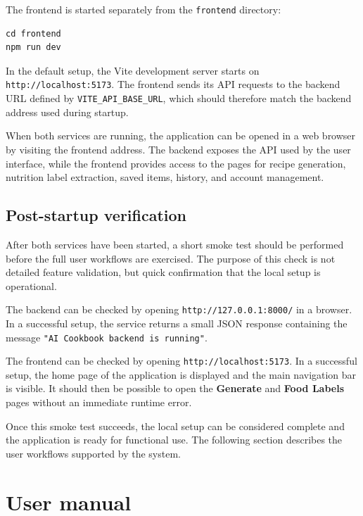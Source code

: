 The frontend is started separately from the \texttt{frontend}
directory:

\begin{lstlisting}
cd frontend
npm run dev
\end{lstlisting}

In the default setup, the Vite development server starts on
\texttt{http://localhost:5173}. The frontend sends its API requests to
the backend URL defined by \texttt{VITE\_API\_BASE\_URL}, which should
therefore match the backend address used during startup.

When both services are running, the application can be opened in a web
browser by visiting the frontend address. The backend exposes the API
used by the user interface, while the frontend provides access to the
pages for recipe generation, nutrition label extraction, saved items,
history, and account management.

\subsection{Post-startup verification}

After both services have been started, a short smoke test should be
performed before the full user workflows are exercised. The purpose of
this check is not detailed feature validation, but quick confirmation
that the local setup is operational.

The backend can be checked by opening
\texttt{http://127.0.0.1:8000/} in a browser. In a successful setup,
the service returns a small JSON response containing the message
\texttt{"AI Cookbook backend is running"}.

The frontend can be checked by opening
\texttt{http://localhost:5173}. In a successful setup, the home page
of the application is displayed and the main navigation bar is visible.
It should then be possible to open the \textbf{Generate} and
\textbf{Food Labels} pages without an immediate runtime error.

Once this smoke test succeeds, the local setup can be considered
complete and the application is ready for functional use. The
following section describes the user workflows supported by the
system.

\section{User manual}

